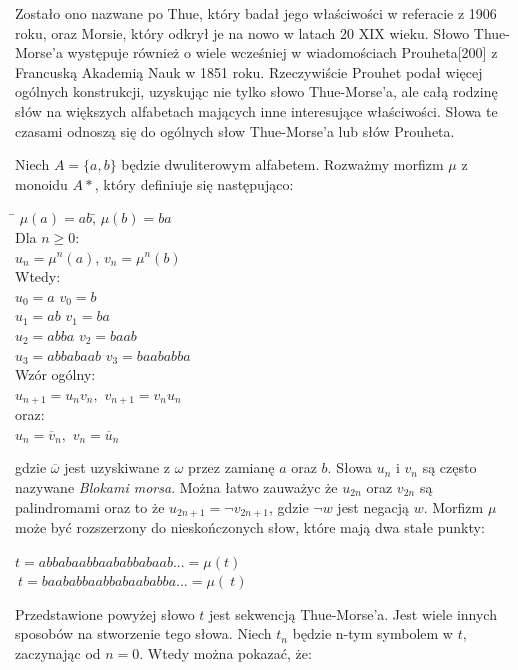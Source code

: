 \documentclass[document]{xmgr}
\begin{document}
Zostało ono nazwane po Thue, który badał jego właściwości w referacie z 1906 roku, oraz Morsie, który odkrył je na nowo w latach 20 XIX wieku. Słowo Thue-Morse'a występuje również o wiele wcześniej w wiadomościach Prouheta[200] z Francuską Akademią Nauk w 1851 roku. Rzeczywiście Prouhet podał więcej ogólnych konstrukcji, uzyskując nie tylko słowo Thue-Morse'a, ale całą rodzinę słów na większych alfabetach mających inne interesujące właściwości. Słowa te czasami odnoszą się do ogólnych słow Thue-Morse'a lub słów Prouheta.

Niech $A = \{a, b\}$ będzie dwuliterowym alfabetem. Rozważmy morfizm $\mu$ z monoidu $A*$, który definiuje się następująco:



\begin{tabbing}

\hspace{8em}\= $\mu(a) = ab$,\hspace{7em}\= $\mu(b) = ba$\\
Dla $n \geq 0$:\\
\> $u_n = \mu^n(a)$,\> $v_n = \mu^n(b)$\\
Wtedy:\\
\> $u_0 = a$ \> $v_0 = b$\\
\> $u_1 = ab$ \> $v_1 = ba$\\
\> $u_2 = abba$	 \> $v_2 = baab$\\
\> $u_3 = abbabaab$ \> $v_3 = baababba$\\
Wzór ogólny:\\
\> $u_{n+1} = u_n v_n,$ \> $v_{n+1} = v_n u_n$\\
oraz:\\
\> $u_n = \overline{v}_n,$ \> $v_n = \overline{u}_n$
\end{tabbing}

gdzie $\overline{\omega}$ jest uzyskiwane z $\omega$ przez zamianę $a$ oraz $b$. Słowa $u_n$ i $v_n$ są często nazywane \textit{Blokami morsa}. Można łatwo zauważyc że $u_{2n}$ oraz $v_{2n}$ są palindromami oraz to że $u_{2n+1} = \neg v_{2n+1}$, gdzie $\neg w$ jest negacją $w$. Morfizm $\mu$ może być rozszerzony do nieskończonych słow, które mają dwa stałe punkty:


{\centering 
$t = abbabaabbaababbabaab... = \mu(t)$ \\
$~t = baababbaabbabaababba... = \mu(~t)$ 
\par}



Przedstawione powyżej słowo $t$ jest sekwencją Thue-Morse'a. Jest wiele innych sposobów na stworzenie tego słowa. Niech $t_n$ będzie n-tym symbolem w $t$, zaczynając od $n = 0$. Wtedy można pokazać, że:
\end{document}
